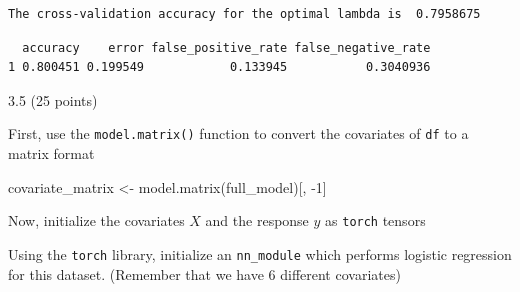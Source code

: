 \documentclass[
  letterpaper,
  DIV=11,
  numbers=noendperiod]{scrartcl}
\newenvironment{Shaded}{\begin{snugshade}}{\end{snugshade}}
\newcommand{\AttributeTok}[1]{\textcolor[rgb]{0.40,0.45,0.13}{#1}}
\newcommand{\DecValTok}[1]{\textcolor[rgb]{0.68,0.00,0.00}{#1}}
\newcommand{\FunctionTok}[1]{\textcolor[rgb]{0.28,0.35,0.67}{#1}}
\newcommand{\NormalTok}[1]{\textcolor[rgb]{0.00,0.23,0.31}{#1}}
\newcommand{\OtherTok}[1]{\textcolor[rgb]{0.00,0.23,0.31}{#1}}
\newcommand{\SpecialCharTok}[1]{\textcolor[rgb]{0.37,0.37,0.37}{#1}}
\begin{document}
\begin{verbatim}
The cross-validation accuracy for the optimal lambda is  0.7958675 
\end{verbatim}

\begin{Shaded}
\end{Shaded}

\begin{verbatim}
  accuracy    error false_positive_rate false_negative_rate
1 0.800451 0.199549            0.133945           0.3040936
\end{verbatim}

3.5 (25 points)

First, use the \texttt{model.matrix()} function to convert the
covariates of \texttt{df} to a matrix format

\begin{Shaded}
\begin{Highlighting}[]
\NormalTok{covariate\_matrix }\OtherTok{\textless{}{-}} \FunctionTok{model.matrix}\NormalTok{(full\_model)[, }\SpecialCharTok{{-}}\DecValTok{1}\NormalTok{]}
\end{Highlighting}
\end{Shaded}

Now, initialize the covariates \(X\) and the response \(y\) as
\texttt{torch} tensors

\begin{Shaded}
\end{Shaded}

Using the \texttt{torch} library, initialize an \texttt{nn\_module}
which performs logistic regression for this dataset. (Remember that we
have 6 different covariates)
\end{document}
